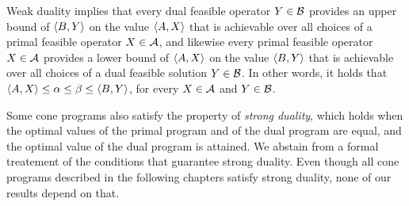 Weak duality implies that every dual feasible operator $Y \in \mathcal{B}$ provides an
upper bound of $\langle B , Y\rangle$ on the value $\langle A , X\rangle$ that is achievable over all
choices of a primal feasible operator $X \in \mathcal{A}$, and likewise every primal feasible 
operator $X \in \mathcal{A}$ provides a lower bound of $\langle A , X\rangle$ on the value 
$\langle B , Y\rangle$
that is achievable over all choices of a dual feasible solution $Y \in \mathcal{B}$. 
In other words, it holds that
$\langle A , X\rangle \leq \alpha \leq \beta \leq \langle B , Y\rangle$,
for every $X \in \mathcal{A}$ and $Y \in \mathcal{B}$. 

Some cone programs also satisfy 
the property of \emph{strong duality}, which holds when
the optimal values of the primal program and of the dual program are equal, and 
the optimal value of the dual program is attained.
We abstain from a formal treatement of the conditions that guarantee
strong duality. Even though all cone programs described in the following chapters 
satisfy strong duality, none of our results depend on that.
